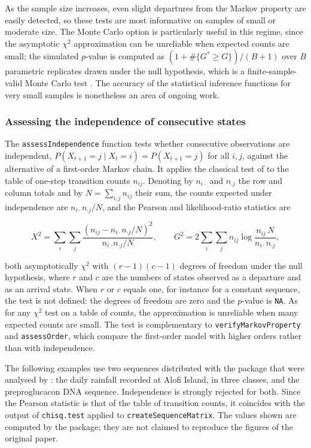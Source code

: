 \documentclass[
  nojss]{jss}
\begin{document}
As the sample size increases, even slight departures from the Markov property are easily detected, so these tests are most informative on samples of small or moderate size. The Monte Carlo option is particularly useful in this regime, since the asymptotic \(\chi^2\) approximation can be unreliable when expected counts are small; the simulated \(p\)-value is computed as \((1+\#\{G^*\ge G\})/(B+1)\) over \(B\) parametric replicates drawn under the null hypothesis, which is a finite-sample-valid Monte Carlo test \citep{davisonHinkley1997}. The accuracy of the statistical inference functions for very small samples is nonetheless an area of ongoing work.

\subsubsection{Assessing the independence of consecutive states}\label{assessing-the-independence-of-consecutive-states}

The \texttt{assessIndependence} function tests whether consecutive observations are independent, \(P(X_{t+1}=j \mid X_t=i)=P(X_{t+1}=j)\) for all \(i,j\), against the alternative of a first-order Markov chain. It applies the classical test of \cite{anderson1957statistical} to the table of one-step transition counts \(n_{ij}\). Denoting by \(n_{i\cdot}\) and \(n_{\cdot j}\) the row and column totals and by \(N=\sum_{i,j}n_{ij}\) their sum, the counts expected under independence are \(n_{i\cdot}n_{\cdot j}/N\), and the Pearson and likelihood-ratio statistics are

\[
X^2=\sum_{i}\sum_{j}\frac{(n_{ij}-n_{i\cdot}n_{\cdot j}/N)^2}{n_{i\cdot}n_{\cdot j}/N}, \qquad
G^2=2\sum_{i}\sum_{j} n_{ij}\log\frac{n_{ij}\,N}{n_{i\cdot}n_{\cdot j}},
\]

both asymptotically \(\chi^2\) with \((r-1)(c-1)\) degrees of freedom under the null hypothesis, where \(r\) and \(c\) are the numbers of states observed as a departure and as an arrival state. When \(r\) or \(c\) equals one, for instance for a constant sequence, the test is not defined: the degrees of freedom are zero and the \(p\)-value is \texttt{NA}. As for any \(\chi^2\) test on a table of counts, the approximation is unreliable when many expected counts are small. The test is complementary to \texttt{verifyMarkovProperty} and \texttt{assessOrder}, which compare the first-order model with higher orders rather than with independence.

The following examples use two sequences distributed with the package that were analysed by \cite{averyHenderson}: the daily rainfall recorded at Alofi Island, in three classes, and the preproglucacon DNA sequence. Independence is strongly rejected for both. Since the Pearson statistic is that of the table of transition counts, it coincides with the output of \texttt{chisq.test} applied to \texttt{createSequenceMatrix}. The values shown are computed by the package; they are not claimed to reproduce the figures of the original paper.
\end{document}
